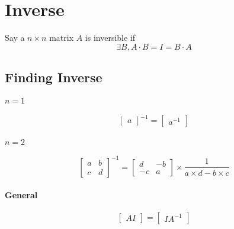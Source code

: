 \section{Inverse}

\begin{definition}
  Say a $ n \times n $ matrix $ A $ is inversible if 
  \begin{displaymath}
    \exists B, A \cdot B = I = B \cdot A
  \end{displaymath}
\end{definition}

\subsection{Finding Inverse}

  \paragraph{$ n = 1 $}
  \begin{equation}
    \begin{bmatrix}
      a
    \end{bmatrix}^{-1}
    =
    \begin{bmatrix}
      a^{-1}
    \end{bmatrix}
  \end{equation}
  
  \paragraph{$ n = 2 $}
  \begin{equation}
    \begin{bmatrix}
      a & b \\ 
      c & d
    \end{bmatrix}^{-1}
    =
    \begin{bmatrix}
      d & -b \\ 
      -c & a
    \end{bmatrix}
    \times \frac{1}{a \times d - b \times c}
  \end{equation}
  
  \paragraph{General}
  \begin{equation}
    \begin{bmatrix}
      A I
    \end{bmatrix}
    =
    \begin{bmatrix}
      I A^{-1}
    \end{bmatrix}
  \end{equation}
  

